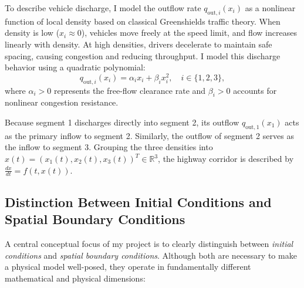 \documentclass[runningheads]{llncs}
\begin{document}
To describe vehicle discharge, I model the outflow rate $q_{\text{out}, i}(x_i)$ as a nonlinear function of local density based on classical Greenshields traffic theory. When density is low ($x_i \approx 0$), vehicles move freely at the speed limit, and flow increases linearly with density. At high densities, drivers decelerate to maintain safe spacing, causing congestion and reducing throughput. I model this discharge behavior using a quadratic polynomial:
\begin{equation}
\label{eq:outflow_law}
q_{\text{out}, i}(x_i) = \alpha_i x_i + \beta_i x_i^2, \quad i \in \{1, 2, 3\},
\end{equation}
where $\alpha_i > 0$ represents the free-flow clearance rate and $\beta_i > 0$ accounts for nonlinear congestion resistance.

Because segment 1 discharges directly into segment 2, its outflow $q_{\text{out}, 1}(x_1)$ acts as the primary inflow to segment 2. Similarly, the outflow of segment 2 serves as the inflow to segment 3. Grouping the three densities into $x(t) = (x_1(t), x_2(t), x_3(t))^T \in \mathbb{R}^3$, the highway corridor is described by $\frac{dx}{dt} = f(t, x(t))$.

\subsection{Distinction Between Initial Conditions and Spatial Boundary Conditions}
A central conceptual focus of my project is to clearly distinguish between \emph{initial conditions} and \emph{spatial boundary conditions}. Although both are necessary to make a physical model well-posed, they operate in fundamentally different mathematical and physical dimensions:
\end{document}
